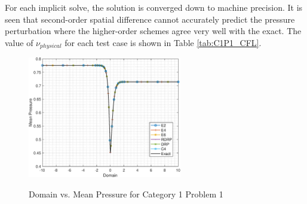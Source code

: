 \documentclass[conf]{new-aiaa}
\begin{document}
For each implicit solve, the solution is converged down to machine precision. It is seen that second-order spatial difference cannot accurately predict the pressure perturbation where the higher-order schemes agree very well with the exact. 
The value of $\nu_{physical}$ for each test case is shown in Table \ref{tab:C1P1_CFL}.   

\begin{figure}[hbtp!]
	\centering
	{\includegraphics[width=0.6\textwidth]{C1P1_SteadyState}}
	\caption{Domain vs. Mean Pressure for Category 1 Problem 1}
	\label{fig:C1P1_SteadyState}
\end{figure}
\end{document}
